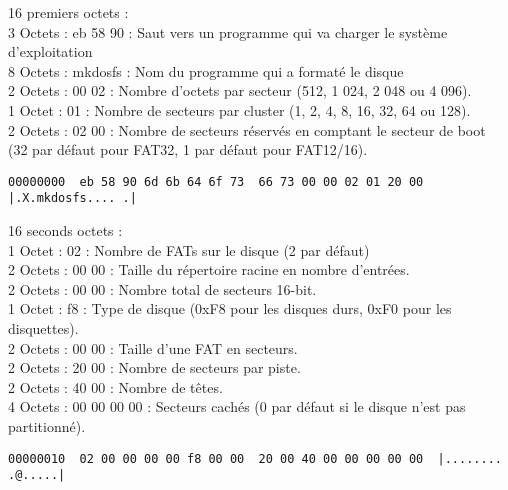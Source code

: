 \documentclass[11pt]{report}
\begin{document}
16 premiers octets : \\
3 Octets : eb 58 90 : Saut vers un programme qui va charger le système d'exploitation \\
8 Octets : mkdosfs : Nom du programme qui a formaté le disque\\
2 Octets : 00 02 : Nombre d'octets par secteur (512, 1 024, 2 048 ou 4 096).\\
1 Octet : 01 : Nombre de secteurs par cluster (1, 2, 4, 8, 16, 32, 64 ou 128).\\
2 Octets : 02 00 : Nombre de secteurs réservés en comptant le secteur de boot\\
(32 par défaut pour FAT32, 1 par défaut pour FAT12/16).
\begin{verbatim}
00000000  eb 58 90 6d 6b 64 6f 73  66 73 00 00 02 01 20 00  |.X.mkdosfs.... .|
\end{verbatim}

16 seconds octets :\\
1 Octet : 02 : Nombre de FATs sur le disque (2 par défaut)\\
2 Octets : 00 00 : Taille du répertoire racine en nombre d'entrées.\\
2 Octets : 00 00 : Nombre total de secteurs 16-bit.\\
1 Octet : f8 : Type de disque (0xF8 pour les disques durs, 0xF0 pour les disquettes).\\
2 Octets : 00 00 : Taille d'une FAT en secteurs.\\
2 Octets : 20 00 : Nombre de secteurs par piste.\\
2 Octets : 40 00 : Nombre de têtes.\\
4 Octets : 00 00 00 00 : Secteurs cachés (0 par défaut si le disque n'est pas partitionné).
\begin{verbatim}
00000010  02 00 00 00 00 f8 00 00  20 00 40 00 00 00 00 00  |........ .@.....|
\end{verbatim}
\newpage
\end{document}
